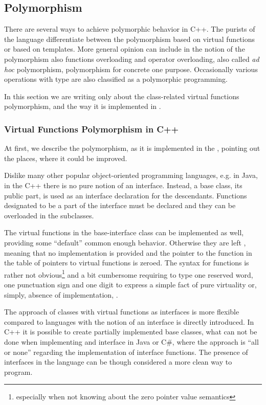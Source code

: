 \subsection{Polymorphism}

There are several ways to achieve polymorphic behavior in C++. The purists of the language differentiate 
between the polymorphism based on virtual functions or based on templates. More general opinion can include
in the notion of the polymorphism also functions overloading and operator overloading, also called 
\emph{ad hoc} polymorphism, polymorphism for concrete one purpose. 
Occasionally various operations with  type are also classified as a polymorphic programming.

In this section we are writing only about the class-related virtual functions polymorphism, and the way it is 
implemented in \pcpp.

\subsubsection{Virtual Functions Polymorphism in C++}
\label{cpppolydefs}

At first, we describe the polymorphism, as it is implemented in the \cpppl, pointing out the places, where it could be improved.

Dislike many other popular object-oriented programming languages, e.g. in Java, in the C++ there is no pure notion of
an interface. Instead, a base class, its public part, is used as an interface declaration for the descendants. 
Functions designated to be a part of the interface must be declared  and they can be overloaded in
the subclasses.

The virtual functions in the base-interface class can be implemented as well, providing some ``default''
common enough behavior. Otherwise they are left , meaning that no implementation is provided
and the pointer to the function in the table of pointers to virtual functions is zeroed. The syntax
for  functions is rather not obvious\footnote{especially when not knowing about the zero pointer value semantics}
and a bit cumbersome requiring to type one reserved word, one punctuation sign and one digit to 
express a simple fact of pure virtuality or, simply, absence of implementation, .


The approach of classes with virtual functions as interfaces is more flexible compared to languages with the notion 
of an interface is directly introduced.
In C++ it is possible to create partially implemented base classes, what can not be done when implementing
and interface in Java or C\#, where the approach is ``all or none'' regarding the implementation of interface
functions. The presence of interfaces in the language can be though considered a more clean way to program.

